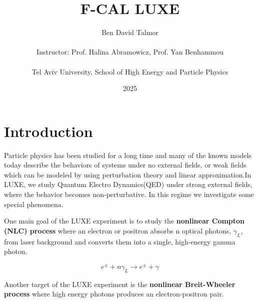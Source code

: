 \documentclass[11pt]{article}
\begin{document}
\title{
    \vspace{4.0cm}
    \large{\bf{F-CAL LUXE}\\ \vspace{0.3cm}
        {\large }
        \vspace{2.0cm}
    }
}

\author{Ben David Talmor   \\\\
    Instructor: Prof. Halina Abramowicz, Prof. Yan Benhammou\\\\
    Tel Aviv University, School of High Energy and Particle Physics}
\date{2025}

\maketitle

\vspace{4.0cm}






\newpage
\tableofcontents
\newpage





\section{Introduction}
Particle physics has been studied for a long time and many of the known models today describe the behaviors of systems under no external fields, or weak fields which can be modeled by using perturbation theory and linear approximation.In LUXE, we study Quantum Electro Dynamics(QED) under strong external fields, where the behavior becomes non-perturbative. In this regime we investigate some special phenomena.

One main goal of the LUXE experiment is to study the \textbf{nonlinear Compton (NLC) process} where an electron or positron absorbs n optical photons, $\gamma_L$, from laser background and converts them into a single, high-energy gamma photon.

\begin{equation}
    e^{\pm} + n \gamma_L \longrightarrow e^{\pm} + \gamma
\end{equation}

Another target of the LUXE experiment is the \textbf{nonlinear Breit-Wheeler process} where high energy photons produces an electron-positron pair.
\end{document}
